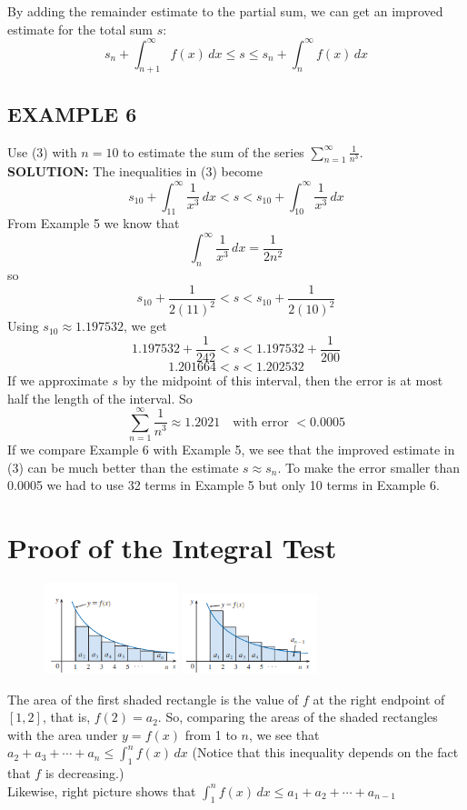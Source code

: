\documentclass{article}
\theoremstyle{mystyle}
\begin{document}
By adding the remainder estimate to the partial sum, we can get an improved estimate for the total sum \(s\):
\[ s_n + \int_{n+1}^\infty f(x) \,dx \le s \le s_n + \int_n^\infty f(x) \,dx \]

\subsection*{EXAMPLE 6}
Use (3) with \( n = 10 \) to estimate the sum of the series \( \sum_{n=1}^{\infty} \frac{1}{n^3} \).\\
\textbf{SOLUTION:}
The inequalities in (3) become
\[ s_{10} + \int_{11}^{\infty} \frac{1}{x^3} \,dx < s < s_{10} + \int_{10}^{\infty} \frac{1}{x^3} \,dx \]
From Example 5 we know that
\[ \int_n^\infty \frac{1}{x^3} \,dx = \frac{1}{2n^2} \]
so
\[ s_{10} + \frac{1}{2(11)^2} < s < s_{10} + \frac{1}{2(10)^2} \]
Using \( s_{10} \approx 1.197532 \), we get
\[ 1.197532 + \frac{1}{242} < s < 1.197532 + \frac{1}{200} \]
\[ 1.201664 < s < 1.202532 \]
If we approximate \( s \) by the midpoint of this interval, then the error is at most half the length of the interval. So
\[ \sum_{n=1}^{\infty} \frac{1}{n^3} \approx 1.2021 \quad \text{with error } < 0.0005 \]
If we compare Example 6 with Example 5, we see that the improved estimate in (3) can be much better than the estimate \( s \approx s_n \). To make the error smaller than 0.0005 we had to use 32 terms in Example 5 but only 10 terms in Example 6.

\section*{Proof of the Integral Test}

\begin{figure}[htbp]
    \centering
    \includegraphics[width=0.35\textwidth]{graph74.png}
    \includegraphics[width=0.35\textwidth]{graph75.png}
\end{figure}
The area of the first shaded rectangle is the value of \( f \) at the right endpoint of \( [1, 2] \), that is, \( f(2) = a_2 \). So, comparing the areas of the shaded rectangles with the area under \( y = f(x) \) from 1 to \( n \), we see that
$a_2 + a_3 + \cdots + a_n \le \int_1^n f(x) \,dx \label{eq:4}$
(Notice that this inequality depends on the fact that \( f \) is decreasing.) \\
Likewise, right picture shows that
$\int_1^n f(x) \,dx \le a_1 + a_2 + \cdots + a_{n-1} \label{eq:5}$
\end{document}
